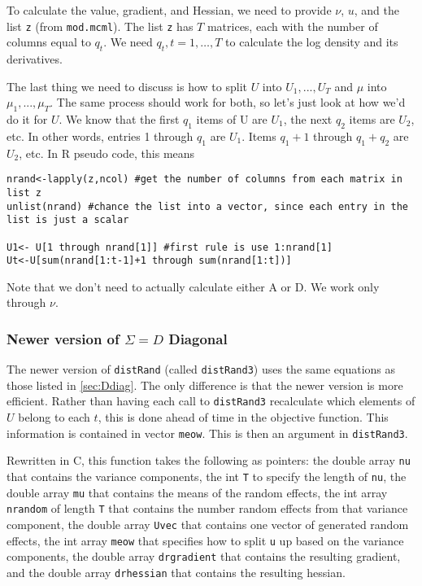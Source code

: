 \documentclass{article}
\begin{document}
To calculate the value, gradient, and Hessian, we need to provide  $\nu$, $u$, and the list \texttt{z} (from \texttt{mod.mcml}).  The list \texttt{z} has $T$ matrices, each with the number of columns equal to $q_t$. We need $q_t,t=1,\ldots,T$ to calculate the log density and its derivatives.



The last thing we need to discuss is how to split $U$ into $U_1,...,U_T$ and $\mu$ into $\mu_1,...,\mu_T$. The same process should work for both, so let's just look at how we'd do it for $U$.  We know that the first $q_1$ items of U are $U_1$, the next $q_2$ items are $U_2$, etc.  In other words, entries 1 through $q_1$ are $U_1$. Items $q_1+1$ through $q_1+q_2$ are $U_2$, etc. In R pseudo code, this means 
\begin{verbatim}
nrand<-lapply(z,ncol) #get the number of columns from each matrix in list z
unlist(nrand) #chance the list into a vector, since each entry in the list is just a scalar

U1<- U[1 through nrand[1]] #first rule is use 1:nrand[1]
Ut<-U[sum(nrand[1:t-1]+1 through sum(nrand[1:t])]
\end{verbatim} 

Note that we don't need to actually calculate either A or D. We work only through $\nu$.

\subsubsection{Newer version of $\Sigma=D$ Diagonal}
The newer version of \texttt{distRand} (called \texttt{distRand3}) uses the same equations as those listed in \ref{sec:Ddiag}. The only difference is that the newer version is more efficient. Rather than having each call to \texttt{distRand3} recalculate which elements of $U$ belong to each $t$, this is done ahead of time in the objective function. This information is contained in vector \texttt{meow}. This is then an argument in \texttt{distRand3}.

Rewritten in C, this function takes the following as pointers: the double array \texttt{nu} that contains the variance components, the int \texttt{T} to specify the length of \texttt{nu}, the double array \texttt{mu} that contains the means of the random effects, the int array \texttt{nrandom} of length \texttt{T} that contains the number random effects from that variance component, the double array \texttt{Uvec} that contains one vector of generated random effects,  the int array \texttt{meow} that specifies how to split \texttt{u} up based on the variance components, the double array \texttt{drgradient} that  contains the resulting gradient, and the double array \texttt{drhessian} that  contains the resulting hessian.
\end{document}
